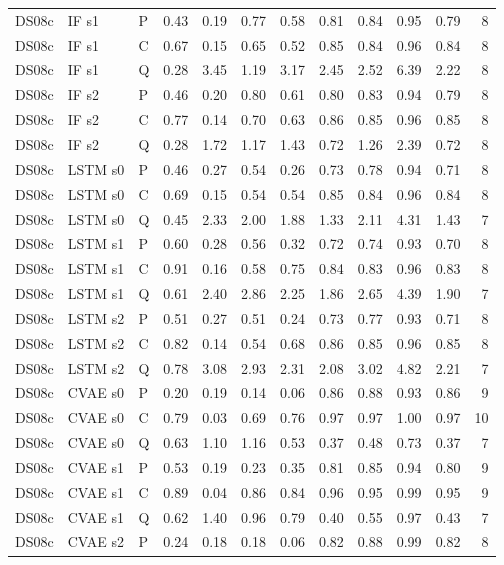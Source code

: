 \documentclass[10pt]{article}
\begin{document}
{\begin{longtable}{lllrrrrrrrrr}
DS08c & IF s1 & P & 0.43 & 0.19 & 0.77 & 0.58 & 0.81 & 0.84 & 0.95 & 0.79 & 8 \\
DS08c & IF s1 & C & 0.67 & 0.15 & 0.65 & 0.52 & 0.85 & 0.84 & 0.96 & 0.84 & 8 \\
DS08c & IF s1 & Q & 0.28 & 3.45 & 1.19 & 3.17 & 2.45 & 2.52 & 6.39 & 2.22 & 8 \\
DS08c & IF s2 & P & 0.46 & 0.20 & 0.80 & 0.61 & 0.80 & 0.83 & 0.94 & 0.79 & 8 \\
DS08c & IF s2 & C & 0.77 & 0.14 & 0.70 & 0.63 & 0.86 & 0.85 & 0.96 & 0.85 & 8 \\
DS08c & IF s2 & Q & 0.28 & 1.72 & 1.17 & 1.43 & 0.72 & 1.26 & 2.39 & 0.72 & 8 \\
DS08c & LSTM s0 & P & 0.46 & 0.27 & 0.54 & 0.26 & 0.73 & 0.78 & 0.94 & 0.71 & 8 \\
DS08c & LSTM s0 & C & 0.69 & 0.15 & 0.54 & 0.54 & 0.85 & 0.84 & 0.96 & 0.84 & 8 \\
DS08c & LSTM s0 & Q & 0.45 & 2.33 & 2.00 & 1.88 & 1.33 & 2.11 & 4.31 & 1.43 & 7 \\
DS08c & LSTM s1 & P & 0.60 & 0.28 & 0.56 & 0.32 & 0.72 & 0.74 & 0.93 & 0.70 & 8 \\
DS08c & LSTM s1 & C & 0.91 & 0.16 & 0.58 & 0.75 & 0.84 & 0.83 & 0.96 & 0.83 & 8 \\
DS08c & LSTM s1 & Q & 0.61 & 2.40 & 2.86 & 2.25 & 1.86 & 2.65 & 4.39 & 1.90 & 7 \\
DS08c & LSTM s2 & P & 0.51 & 0.27 & 0.51 & 0.24 & 0.73 & 0.77 & 0.93 & 0.71 & 8 \\
DS08c & LSTM s2 & C & 0.82 & 0.14 & 0.54 & 0.68 & 0.86 & 0.85 & 0.96 & 0.85 & 8 \\
DS08c & LSTM s2 & Q & 0.78 & 3.08 & 2.93 & 2.31 & 2.08 & 3.02 & 4.82 & 2.21 & 7 \\
DS08c & CVAE s0 & P & 0.20 & 0.19 & 0.14 & 0.06 & 0.86 & 0.88 & 0.93 & 0.86 & 9 \\
DS08c & CVAE s0 & C & 0.79 & 0.03 & 0.69 & 0.76 & 0.97 & 0.97 & 1.00 & 0.97 & 10 \\
DS08c & CVAE s0 & Q & 0.63 & 1.10 & 1.16 & 0.53 & 0.37 & 0.48 & 0.73 & 0.37 & 7 \\
DS08c & CVAE s1 & P & 0.53 & 0.19 & 0.23 & 0.35 & 0.81 & 0.85 & 0.94 & 0.80 & 9 \\
DS08c & CVAE s1 & C & 0.89 & 0.04 & 0.86 & 0.84 & 0.96 & 0.95 & 0.99 & 0.95 & 9 \\
DS08c & CVAE s1 & Q & 0.62 & 1.40 & 0.96 & 0.79 & 0.40 & 0.55 & 0.97 & 0.43 & 7 \\
DS08c & CVAE s2 & P & 0.24 & 0.18 & 0.18 & 0.06 & 0.82 & 0.88 & 0.99 & 0.82 & 8 \\

\end{longtable}}
\end{document}

